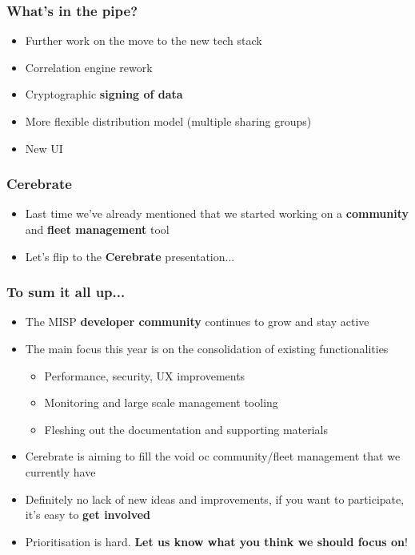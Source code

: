 \begin{frame}
\frametitle{What's in the pipe?}
\begin{itemize}
	\item Further work on the move to the new tech stack
        \item Correlation engine rework
        \item Cryptographic {\bf signing of data}
        \item More flexible distribution model (multiple sharing groups)
        \item New UI
\end{itemize}
\end{frame}

\begin{frame}
\frametitle{Cerebrate}
\begin{itemize}
        \item Last time we've already mentioned that we started working on a {\bf community} and {\bf fleet management} tool
	\item Let's flip to the {\bf Cerebrate} presentation...
\end{itemize}
\end{frame}

\begin{frame}
  \frametitle{To sum it all up...}
  \begin{itemize}
     \item The MISP {\bf developer community} continues to grow and stay active
     \item The main focus this year is on the consolidation of existing functionalities
     \begin{itemize}
          \item Performance, security, UX improvements
          \item Monitoring and large scale management tooling
          \item Fleshing out the documentation and supporting materials
     \end{itemize}
     \item Cerebrate is aiming to fill the void oc community/fleet management that we currently have
     \item Definitely no lack of new ideas and improvements, if you want to participate, it's easy to {\bf get involved}
     \item Prioritisation is hard. {\bf Let us know what you think we should focus on}!
  \end{itemize}
\end{frame}

